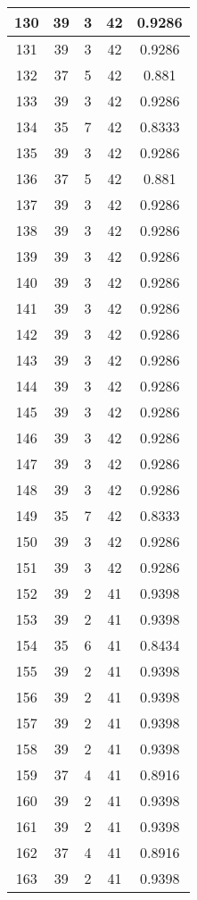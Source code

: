 \documentclass[letterpaper, 12pt]{article}
\begin{document}
\begin{longtable}{|c|c|c|c|c|}
\hline
130 & 39 & 3 & 42 & 0.9286 \\
\hline
131 & 39 & 3 & 42 & 0.9286 \\
\hline
132 & 37 & 5 & 42 & 0.881 \\
\hline
133 & 39 & 3 & 42 & 0.9286 \\
\hline
134 & 35 & 7 & 42 & 0.8333 \\
\hline
135 & 39 & 3 & 42 & 0.9286 \\
\hline
136 & 37 & 5 & 42 & 0.881 \\
\hline
137 & 39 & 3 & 42 & 0.9286 \\
\hline
138 & 39 & 3 & 42 & 0.9286 \\
\hline
139 & 39 & 3 & 42 & 0.9286 \\
\hline
140 & 39 & 3 & 42 & 0.9286 \\
\hline
141 & 39 & 3 & 42 & 0.9286 \\
\hline
142 & 39 & 3 & 42 & 0.9286 \\
\hline
143 & 39 & 3 & 42 & 0.9286 \\
\hline
144 & 39 & 3 & 42 & 0.9286 \\
\hline
145 & 39 & 3 & 42 & 0.9286 \\
\hline
146 & 39 & 3 & 42 & 0.9286 \\
\hline
147 & 39 & 3 & 42 & 0.9286 \\
\hline
148 & 39 & 3 & 42 & 0.9286 \\
\hline
149 & 35 & 7 & 42 & 0.8333 \\
\hline
150 & 39 & 3 & 42 & 0.9286 \\
\hline
151 & 39 & 3 & 42 & 0.9286 \\
\hline
152 & 39 & 2 & 41 & 0.9398 \\
\hline
153 & 39 & 2 & 41 & 0.9398 \\
\hline
154 & 35 & 6 & 41 & 0.8434 \\
\hline
155 & 39 & 2 & 41 & 0.9398 \\
\hline
156 & 39 & 2 & 41 & 0.9398 \\
\hline
157 & 39 & 2 & 41 & 0.9398 \\
\hline
158 & 39 & 2 & 41 & 0.9398 \\
\hline
159 & 37 & 4 & 41 & 0.8916 \\
\hline
160 & 39 & 2 & 41 & 0.9398 \\
\hline
161 & 39 & 2 & 41 & 0.9398 \\
\hline
162 & 37 & 4 & 41 & 0.8916 \\
\hline
163 & 39 & 2 & 41 & 0.9398 \\

\end{longtable}
\end{document}

